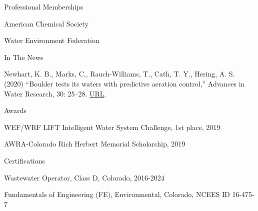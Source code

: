 \documentclass{resume} %
\begin{document}
\begin{rSection}{Professional Memberships}

American Chemical Society

Water Environment Federation

\end{rSection}

\begin{rSection}{In The News}

Newhart, K. B., Marks, C., Rauch-Williams, T., Cath, T. Y., Hering, A. S. (2020) “Boulder tests its waters with predictive aeration control,” Advances in Water Research, 30: 25–28. \href{https://www.advancesinwaterresearch.org/awr/20200709/MobilePagedArticle.action?articleId=1621836&pm=1#articleId1621836}{URL}.
\end{rSection}


\begin{rSection}{Awards}

WEF/WRF LIFT Intelligent Water System Challenge, 1st place, 2019

AWRA-Colorado Rich Herbert Memorial Scholarship, 2019

\end{rSection}


\begin{rSection}{Certifications}

Wastewater Operator, Class D, Colorado, 2016-2024

Fundamentals of Engineering (FE), Environmental, Colorado, NCEES ID 16-475-7
\end{rSection}
\end{document}
